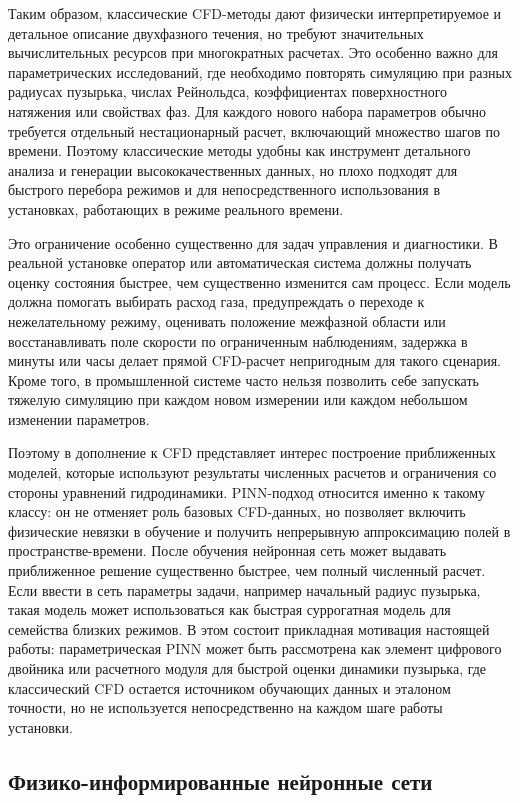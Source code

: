 \documentclass[12pt,a4paper]{article}
\begin{document}
Таким образом, классические CFD-методы дают физически интерпретируемое и
детальное описание двухфазного течения, но требуют значительных вычислительных
ресурсов при многократных расчетах. Это особенно важно для параметрических
исследований, где необходимо повторять симуляцию при разных радиусах пузырька,
числах Рейнольдса, коэффициентах поверхностного натяжения или свойствах фаз.
Для каждого нового набора параметров обычно требуется отдельный нестационарный
расчет, включающий множество шагов по времени. Поэтому классические методы
удобны как инструмент детального анализа и генерации высококачественных данных,
но плохо подходят для быстрого перебора режимов и для непосредственного
использования в установках, работающих в режиме реального времени.

Это ограничение особенно существенно для задач управления и диагностики. В
реальной установке оператор или автоматическая система должны получать оценку
состояния быстрее, чем существенно изменится сам процесс. Если модель должна
помогать выбирать расход газа, предупреждать о переходе к нежелательному
режиму, оценивать положение межфазной области или восстанавливать поле скорости
по ограниченным наблюдениям, задержка в минуты или часы делает прямой
CFD-расчет непригодным для такого сценария. Кроме того, в промышленной системе
часто нельзя позволить себе запускать тяжелую симуляцию при каждом новом
измерении или каждом небольшом изменении параметров.

Поэтому в дополнение к CFD представляет интерес построение приближенных
моделей, которые используют результаты численных расчетов и ограничения со
стороны уравнений гидродинамики. PINN-подход относится именно к такому классу:
он не отменяет роль базовых CFD-данных, но позволяет включить физические
невязки в обучение и получить непрерывную аппроксимацию полей в
пространстве-времени. После обучения нейронная сеть может выдавать приближенное
решение существенно быстрее, чем полный численный расчет. Если ввести в сеть
параметры задачи, например начальный радиус пузырька, такая модель может
использоваться как быстрая суррогатная модель для семейства близких режимов. В
этом состоит прикладная мотивация настоящей работы: параметрическая PINN может
быть рассмотрена как элемент цифрового двойника или расчетного модуля для
быстрой оценки динамики пузырька, где классический CFD остается источником
обучающих данных и эталоном точности, но не используется непосредственно на
каждом шаге работы установки.

\subsection{Физико-информированные нейронные сети}
\end{document}
